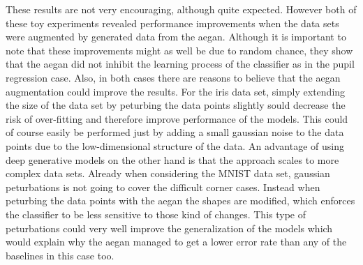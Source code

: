 These results are not very encouraging, although quite expected. However both of these toy experiments revealed performance improvements when the data sets were augmented by generated data from the \acrshort{aegan}. Although it is important to note that these improvements might as well be due to random chance, they show that the \acrshort{aegan} did not inhibit the learning process of the classifier as in the pupil regression case. Also, in both cases there are reasons to believe that the \acrshort{aegan} augmentation could improve the results. For the iris data set, simply extending the size of the data set by peturbing the data points slightly sould decrease the risk of over-fitting and therefore improve performance of the models. This could of course easily be performed just by adding a small gaussian noise to the data points due to the low-dimensional structure of the data. An advantage of using deep generative models on the other hand is that the approach scales to more complex data sets. Already when considering the MNIST data set, gaussian peturbations is not going to cover the difficult corner cases. Instead when peturbing the data points with the \acrshort{aegan} the shapes are modified, which enforces the classifier to be less sensitive to those kind of changes. This type of peturbations could very well improve the generalization of the models which would explain why the \acrshort{aegan} managed to get a lower error rate than any of the baselines in this case too.



